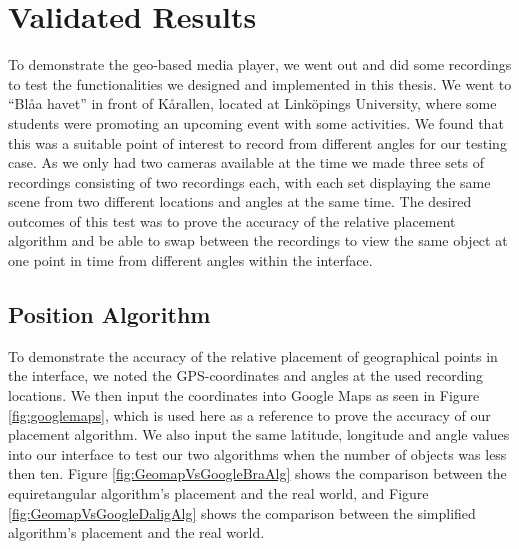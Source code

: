 \chapter{Validated Results}
\label{cha:results}

To demonstrate the geo-based media player, we went out and did some recordings to test the functionalities we designed and implemented in this thesis. We went to “Blåa havet” in front of Kårallen, located at Linköpings University, where some students were promoting an upcoming event with some activities. We found that this was a suitable point of interest to record from different angles for our testing case. As we only had two cameras available at the time we made three sets of recordings consisting of two recordings each, with each set displaying the same scene from two different locations and angles at the same time. The desired outcomes of this test was to prove the accuracy of the relative placement algorithm and be able to swap between the recordings to view the same object at one point in time from different angles within the interface.

\section{Position Algorithm}
\label{sec:positionalgorithm}

To demonstrate the accuracy of the relative placement of geographical points in the interface, we noted the GPS-coordinates and angles at the used recording locations. We then input the coordinates into Google Maps as seen in Figure \ref{fig:googlemaps}, which is used here as a reference to prove the accuracy of our placement algorithm. We also input the same latitude, longitude and angle values into our interface to test our two algorithms when the number of objects was less then ten. Figure \ref{fig:GeomapVsGoogleBraAlg} shows the comparison between the equiretangular algorithm's placement and the real world, and Figure \ref{fig:GeomapVsGoogleDaligAlg} shows the comparison between the simplified algorithm's placement and the real world. 



